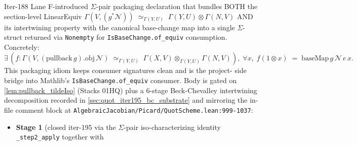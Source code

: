 \begin{definition}

  \label{def:pullback_app_isoTensor_sigma}
  Iter-188 Lane F-introduced \(\Sigma\)-pair packaging declaration that
  bundles BOTH the section-level LinearEquiv
  \(\Gamma(V,(g^*\mathcal N)) \;\simeq_{\Gamma(Y,U)}\; \Gamma(Y,U) \otimes
    \Gamma(N,V)\) AND its intertwining property with the canonical
  base-change map into a single \(\Sigma\)-struct returned via
  \texttt{Nonempty} for \texttt{IsBaseChange.of\_equiv} consumption.
  Concretely:
  \[
    \exists\, (f : \Gamma(V,(\text{pullback}\, g).\mathrm{obj}\,
                     \mathcal N) \;\simeq_{\Gamma(Y,U)}\;
                     \Gamma(X,V) \otimes_{\Gamma(Y,U)} \Gamma(N,V)),\;
      \forall x,\; f(1\otimes x)\;=\;\text{baseMap}\,g\,\mathcal N\,e\,x.
  \]
  This packaging idiom keeps consumer signatures clean and is the project-
  side bridge into Mathlib's \texttt{IsBaseChange.of\_equiv} consumer.
  Body is gated on \cref{lem:pullback_tildeIso} (Stacks 01HQ) plus a
  6-stage Beck-Chevalley intertwining decomposition recorded in
  \cref{sec:quot_iter195_bc_substrate} and mirroring the in-file
  comment block at
  \texttt{AlgebraicJacobian/Picard/QuotScheme.lean:999-1037}:
  \begin{itemize}
    \item \textbf{Stage 1} (closed iter-195 via the \(\Sigma\)-pair
      iso-characterizing identity \texttt{\_step2\_apply} together with

\end{itemize}
\end{definition}
